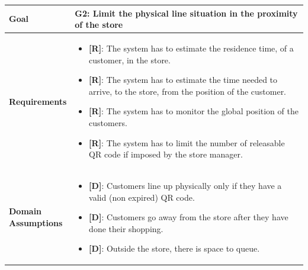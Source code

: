 \begin{table}[H]
\centering
\begin{tabular}{| m{} | m{} |} 
	\hline
	\textbf{Goal} &
		\textbf{G2: Limit the physical line situation in the proximity of the store} \\
	\hline
	\textbf{Requirements} &
		\begin{itemize}
			\item {\textbf{[R]}}: The system has to estimate the residence time, of a customer, in the store.
			\item {\textbf{[R]}}: The system has to estimate the time needed to arrive, to the store, from the position of the customer.
			\item {\textbf{[R]}}: The system has to monitor the global position of the customers.
			\item {\textbf{[R]}}: The system has to limit the number of releasable QR code if imposed by the store manager.
		\end{itemize} \\ 
	\hline
	\shortstack[l]{\textbf{Domain} \\ \textbf{Assumptions}} & 
		\begin{itemize}
			\item {\textbf{[D]}}: Customers line up physically only if they have a valid (non expired) QR code.
			\item {\textbf{[D]}}: Customers go away from the store after they have done their shopping.
			\item {\textbf{[D]}}: Outside the store, there is space to queue.
		\end{itemize} \\ 
	\hline
\end{tabular}
\end{table}

